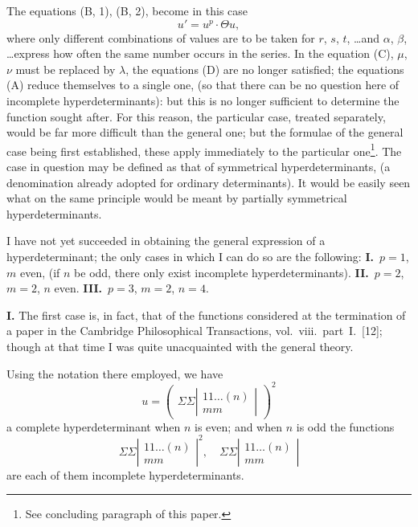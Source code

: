 \documentclass[11pt,a4paper]{article}
\theoremstyle{plain}
\theoremstyle{definition}
\theoremstyle{remark}
\begin{document}
The equations (B, 1), (B, 2), become in this case
\[
u' = u^p \cdot \Theta u
\tag{B, 3},
\]
where only different combinations of values are to be taken for $r$, $s$, $t$, \ldots and
$\alpha$, $\beta$, \ldots express how often the same number occurs in the series. In the equation
(C), $\mu$, $\nu$ must be replaced by $\lambda$, the equations (D) are no longer satisfied; the
equations (A) reduce themselves to a single one, (so that there can be no question
here of incomplete hyperdeterminants): but this is no longer sufficient to determine
the function sought after. For this reason, the particular case, treated separately,
would be far more difficult than the general one; but the formulae of the general case
being first established, these apply immediately to the particular one\footnote{See concluding paragraph of this paper.}. The case in
question may be defined as that of symmetrical hyperdeterminants, (a denomination
already adopted for ordinary determinants). It would be easily seen what on the same
principle would be meant by partially symmetrical hyperdeterminants.

I have not yet succeeded in obtaining the general expression of a hyperdeterminant;
the only cases in which I can do so are the following:
\textbf{I.}\ $p=1$, $m$ even, (if $n$ be odd,
there only exist incomplete hyperdeterminants).
\textbf{II.}\ $p = 2$, $m = 2$, $n$ even. 
\textbf{III.}\ $p = 3$,
$m = 2$, $n = 4$.

\newpage
\textbf{I.} The first case is, in fact, that of the functions considered at the termination of
a paper in the Cambridge Philosophical Transactions, vol.~viii.\ part~I.\ [12]; though at
that time I was quite unacquainted with the general theory.

Using the notation there employed, we have
\[
u = \left(\begin{array}{c}
\Sigma \Sigma \left|\begin{array}{c}
11\ldots(n) \\
mm
\end{array}\right|
\end{array}\right)^2
\]
a complete hyperdeterminant when $n$ is even; and when $n$ is odd the functions
\[
\Sigma \Sigma \left|\begin{array}{c}
11\ldots(n) \\
mm
\end{array}\right|^2, \quad
\Sigma \Sigma \left|\begin{array}{c}
11\ldots(n) \\
mm
\end{array}\right|
\]
are each of them incomplete hyperdeterminants.
\end{document}
